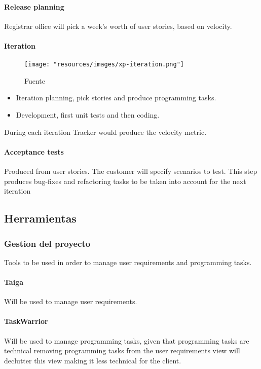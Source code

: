 \paragraph{Release planning} Registrar office will pick a week's worth of user stories, based on velocity.

\paragraph{Iteration}

\begin{figure}
    \texttt{[image: "resources/images/xp-iteration.png"]}
    \caption{Fuente \textcite{XpWeb}}\label{fig:xp-iteration}
\end{figure}

\begin{itemize}
    \item Iteration planning, pick stories and produce programming tasks.
    \item Development, first unit tests and then coding.
\end{itemize}

During each iteration Tracker would produce the velocity metric.

\paragraph{Acceptance tests} Produced from user stories.
The customer will specify scenarios to test. This step produces bug-fixes and refactoring tasks to be taken into account for the next iteration

\subsection{Herramientas}
\subsubsection{Gestion del proyecto}
Tools to be used in order to manage user requirements and programming tasks.

\paragraph{Taiga} Will be used to manage user requirements.

\paragraph{TaskWarrior} Will be used to manage programming tasks, given that programming tasks are technical removing programming tasks from the user requirements view will declutter this view making it less technical for the client.

